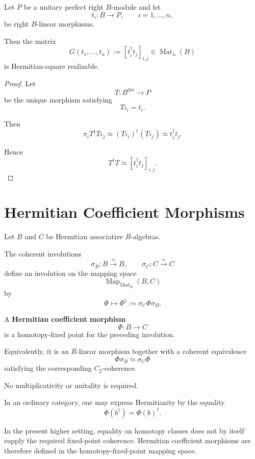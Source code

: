 \begin{proposition}
\label{prop:higher-gram-form-finite-family}
Let \(P\) be a unitary perfect right \(B\)-module and let
\[
  t_i:B\to P,
  \qquad
  i=1,\ldots,n,
\]
be right \(B\)-linear morphisms.

Then the matrix
\[
  G(t_1,\ldots,t_n)
  :=
  [t_i^\dagger t_j]_{i,j}
  \in
  \operatorname{Mat}_n(B)
\]
is Hermitian-square realizable.
\end{proposition}

\begin{proof}
Let
\[
  T:B^{\oplus n}\to P
\]
be the unique morphism satisfying
\[
  T\iota_i=t_i.
\]

Then
\[
  \pi_iT^\dagger T\iota_j
  \simeq
  (T\iota_i)^\dagger(T\iota_j)
  \simeq
  t_i^\dagger t_j.
\]

Hence
\[
  T^\dagger T
  \simeq
  [t_i^\dagger t_j]_{i,j}.
\]
\end{proof}

\section{Hermitian Coefficient Morphisms}
\label{sec:higher-hermitian-coefficients}

Let \(B\) and \(C\) be Hermitian associative \(R\)-algebras.

The coherent involutions
\[
  \sigma_B:B\xrightarrow{\simeq}B,
  \qquad
  \sigma_C:C\xrightarrow{\simeq}C
\]
define an involution on the mapping space
\[
  \operatorname{Map}_{\operatorname{Mod}_R}(B,C)
\]
by
\[
  \Phi
  \longmapsto
  \Phi^\natural
  :=
  \sigma_C\Phi\sigma_B.
\]

\begin{definition}
\label{def:higher-hermitian-coefficient}
A \textbf{Hermitian coefficient morphism}
\[
  \Phi:B\to C
\]
is a homotopy-fixed point for the preceding involution.

Equivalently, it is an \(R\)-linear morphism together with a coherent
equivalence
\[
  \Phi\sigma_B
  \simeq
  \sigma_C\Phi
\]
satisfying the corresponding \(C_2\)-coherence.

No multiplicativity or unitality is required.
\end{definition}

\begin{remark}
\label{rem:higher-hermitianity-coherent-data}
In an ordinary category, one may express Hermitianity by the equality
\[
  \Phi(b^\dagger)=\Phi(b)^\dagger.
\]

In the present higher setting, equality on homotopy classes does not by itself
supply the required fixed-point coherence. Hermitian coefficient morphisms
are therefore defined in the homotopy-fixed-point mapping space.
\end{remark}


